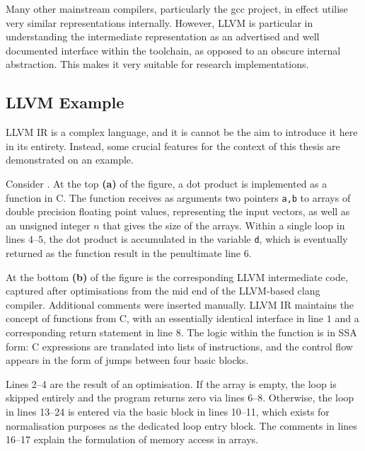     Many other mainstream compilers, particularly the gcc project, in effect
    utilise very similar representations internally.
    However, LLVM is particular in understanding the intermediate
    representation as an advertised and well documented interface within the
    toolchain, as opposed to an obscure internal abstraction.
    This makes it very suitable for research implementations.

\subsection{LLVM Example}

    LLVM IR is a complex language, and it is cannot be the aim to introduce it
    here in its entirety.
    Instead, some crucial features for the context of this thesis are
    demonstrated on an example.

    Consider .
    At the top {\bf (a)} of the figure, a dot product is implemented as a
    function in C.
    The function receives as arguments two pointers {\tt a,b} to arrays of
    double precision floating point values, representing the input vectors, as
    well as an unsigned integer $n$ that gives the size of the arrays.
    Within a single loop in lines $4$--$5$, the dot product is accumulated in
    the variable {\tt d}, which is eventually returned as the function result in
    the penultimate line $6$.

    At the bottom {\bf (b)} of the figure is the corresponding LLVM intermediate
    code, captured after optimisations from the mid end of the LLVM-based clang
    compiler.
    Additional comments were inserted manually.
    LLVM IR maintains the concept of functions from C, with an essentially
    identical interface in line $1$ and a corresponding return statement in
    line $8$.
    The logic within the function is in SSA form: C expressions are translated
    into lists of instructions, and the control flow appears in the form of
    jumps between four basic blocks.

    Lines 2--4 are the result of an optimisation.
    If the array is empty, the loop is skipped entirely and the program returns
    zero via lines 6--8.
    Otherwise, the loop in lines 13--24 is entered via the basic block in lines
    10--11, which exists for normalisation purposes as the dedicated loop entry
    block.
    The comments in lines 16--17 explain the formulation of memory access in
    arrays.


